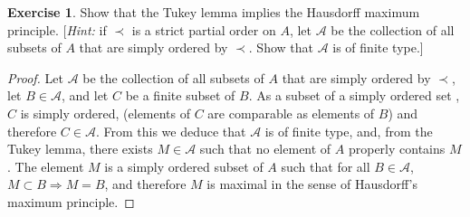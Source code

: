 \documentclass[11pt,a4paper,twoside]{article}
\theoremstyle{definition}
\newcounter{excounter}
\newtheorem{exercise}[excounter]{Exercise}
\begin{document}
\begin{exercise}

  Show that the Tukey lemma implies the Hausdorff maximum principle. [\emph{Hint:} if
  $\prec$ is a strict partial order on $A$, let $\mathscr{A}$ be the collection of all
  subsets of $A$ that are simply ordered by $\prec$. Show that $\mathscr{A}$ is of
  finite type.]

\end{exercise}

\begin{proof}

  Let $\mathscr{A}$ be the collection of all subsets of $A$ that are simply ordered by $\prec$,
  let $B \in \mathscr{A}$, and let $C$ be a finite subset of $B$.
  As a subset of a simply ordered set , $C$ is simply ordered, (elements of $C$ are comparable
  as elements of $B$) and therefore $C \in \mathscr{A}$.
  From this we deduce that $\mathscr{A}$ is of finite type, and, from the Tukey lemma,
  there exists $M \in \mathscr{A}$ such that no element of $A$ properly contains $M$.
  The element $M$ is a simply ordered subset of $A$ such that for all $B \in \mathscr{A}$,
  $M \subset B \Rightarrow M = B$, and therefore $M$ is maximal in the sense of Hausdorff's
  maximum principle.

\end{proof}
\end{document}
